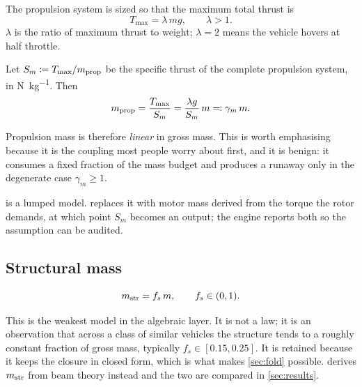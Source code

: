 \begin{definition}
The propulsion system is sized so that the maximum total thrust is
\begin{equation}
  T_{\max} = \lambda\, m g, \qquad \lambda > 1 .
  \label{eq:lambda}
\end{equation}
$\lambda$ is the ratio of maximum thrust to weight; $\lambda = 2$ means the
vehicle hovers at half throttle.
\end{definition}

\begin{model}
\label{mod:sm}
Let $S_m \coloneqq T_{\max}/m_{\mathrm{prop}}$ be the specific thrust of the complete
propulsion system, in \si{\newton\per\kilo\gram}. Then
\begin{equation}
  m_{\mathrm{prop}} = \frac{T_{\max}}{S_m} = \frac{\lambda g}{S_m}\, m
         \eqqcolon \gamma_m\, m .
  \label{eq:mprop}
\end{equation}
\end{model}

Propulsion mass is therefore \emph{linear} in gross mass. This is worth
emphasising because it is the coupling most people worry about first, and it is
benign: it consumes a fixed fraction of the mass budget and produces a runaway
only in the degenerate case $\gamma_m \ge 1$.

 is a lumped model.  replaces it with motor
mass derived from the torque the rotor demands, at which point $S_m$ becomes an
output; the engine reports both so the assumption can be audited.

\subsection{Structural mass}

\begin{model}
\label{mod:fs}
\begin{equation}
  m_{\mathrm{str}} = f_s\, m, \qquad f_s \in (0,1) .
  \label{eq:mstr}
\end{equation}
\end{model}

This is the weakest model in the algebraic layer. It is not a law; it is an
observation that across a class of similar vehicles the structure tends to a
roughly constant fraction of gross mass, typically $f_s \in [0.15,0.25]$. It is
retained because it keeps the closure in closed form, which is what makes
\cref{sec:fold} possible.  derives $m_{\mathrm{str}}$ from beam theory
instead and the two are compared in \cref{sec:results}.

